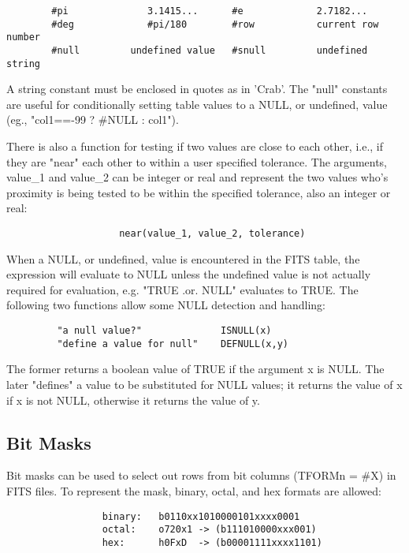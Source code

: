 \documentclass[11pt]{book}
\begin{document}
\begin{verbatim}
        #pi              3.1415...      #e             2.7182...
        #deg             #pi/180        #row           current row number
        #null         undefined value   #snull         undefined string
\end{verbatim}

    A  string constant must  be enclosed  in quotes  as in  'Crab'.  The
    "null" constants  are useful for conditionally  setting table values
    to a NULL, or undefined, value (eg., "col1==-99 ? \#NULL : col1").

    There is also a function for testing if  two  values  are  close  to
    each  other,  i.e.,  if  they are "near" each other to within a user
    specified tolerance. The  arguments,  value\_1  and  value\_2  can  be
    integer  or  real  and  represent  the two values who's proximity is
    being tested to be within the specified tolerance, also  an  integer
    or real:

\begin{verbatim}
                    near(value_1, value_2, tolerance)
\end{verbatim}
    When  a  NULL, or undefined, value is encountered in the FITS table,
    the expression will evaluate to NULL unless the undefined  value  is
    not   actually   required  for  evaluation,  e.g. "TRUE  .or.  NULL"
    evaluates to TRUE. The  following  two  functions  allow  some  NULL
    detection  and  handling:

\begin{verbatim}
         "a null value?"              ISNULL(x)
         "define a value for null"    DEFNULL(x,y)
\end{verbatim}
    The former
    returns a boolean value of TRUE if the  argument  x  is  NULL.   The
    later  "defines"  a  value  to  be  substituted  for NULL values; it
    returns the value of x if x is not NULL, otherwise  it  returns  the
    value of y.


\subsection{Bit Masks}

    Bit  masks can be used to select out rows from bit columns (TFORMn =
    \#X) in FITS files. To represent the mask,  binary,  octal,  and  hex
    formats are allowed:


\begin{verbatim}
                 binary:   b0110xx1010000101xxxx0001
                 octal:    o720x1 -> (b111010000xxx001)
                 hex:      h0FxD  -> (b00001111xxxx1101)
\end{verbatim}
\end{document}
